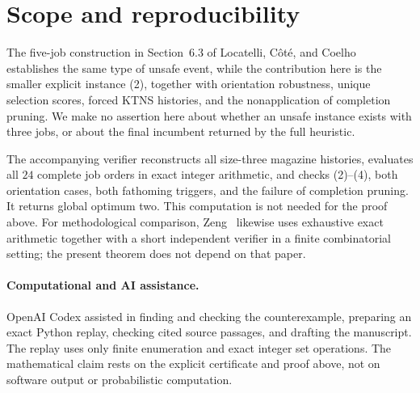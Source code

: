 \documentclass[11pt]{article}
\begin{document}
\section{Scope and reproducibility}

The five-job construction in Section~6.3 of
Locatelli, C\^ot\'e, and Coelho~\cite{LocatelliCoteCoelho2026} establishes the
same type of unsafe event, while the contribution here is the smaller explicit
instance (2), together with orientation robustness, unique selection scores,
forced KTNS histories, and the nonapplication of completion pruning.  We make
no assertion here about whether an unsafe instance exists with three jobs, or
about the final incumbent returned by the full heuristic.

The accompanying verifier reconstructs all size-three magazine histories,
evaluates all $24$ complete job orders in exact integer arithmetic, and checks
(2)--(4), both orientation cases, both fathoming triggers, and the failure of
completion pruning.  It returns global optimum two.  This computation is not
needed for the proof above.  For methodological comparison, Zeng~\cite{Zeng2026Whiskered}
likewise uses exhaustive exact arithmetic together with a short independent
verifier in a finite combinatorial setting; the present theorem does not depend
on that paper.

\paragraph{Computational and AI assistance.}
OpenAI Codex assisted in finding and checking the counterexample, preparing an
exact Python replay, checking cited source passages, and drafting the
manuscript.  The replay uses only finite enumeration and exact integer set
operations.  The mathematical claim rests on the explicit certificate and
proof above, not on software output or probabilistic computation.



\end{document}
